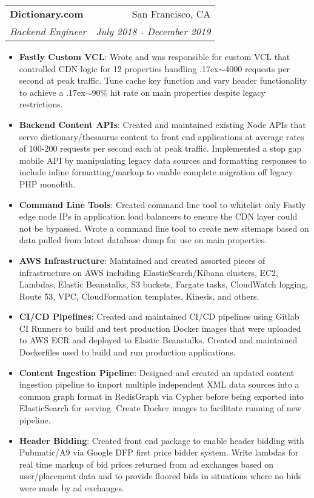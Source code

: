 \documentclass[letterpaper,11pt]{article}
\makeatletter
\newcommand{\resumeItem}[2]{
  \item\small{
    \textbf{#1}{: #2 \vspace{-2pt}}
  }
}
\newcommand{\resumeSubheading}[4]{
  \vspace{-1pt}\item
    \begin{tabular*}{0.97\textwidth}[t]{l@{\extracolsep{\fill}}r}
      \textbf{#1} & #2 \\
      \textit{\small#3} & \textit{\small #4} \\
    \end{tabular*}\vspace{-5pt}
}
\newcommand{\resumeItemListStart}{\begin{itemize}}
\newcommand{\resumeItemListEnd}{\end{itemize}\vspace{-5pt}}
\makeatother
\begin{document}
    \resumeSubheading
      {Dictionary.com}{San Francisco, CA}
      {Backend Engineer}{July 2018 - December 2019}
      \resumeItemListStart
        \resumeItem{Fastly Custom VCL}
          {Wrote and was responsible for custom VCL that controlled CDN logic for 12 properties handling {\raise.17ex\hbox{$\scriptstyle\sim$}}4000 requests per second at peak traffic. Tune cache key function and vary header functionality to achieve a {\raise.17ex\hbox{$\scriptstyle\sim$}}90\% hit rate on main properties despite legacy restrictions.}
        \resumeItem{Backend Content APIs}
          {Created and maintained existing Node APIs that serve dictionary/thesaurus content to front end applications at average rates of 100-200 requests per second each at peak traffic. Implemented a stop gap mobile API by manipulating legacy data sources and formatting responses to include inline formatting/markup to enable complete migration off legacy PHP monolith.}
        \resumeItem{Command Line Tools}
          {Created command line tool to whitelist only Fastly edge node IPs in application load balancers to ensure the CDN layer could not be bypassed. Wrote a command line tool to create new sitemaps based on data pulled from latest database dump for use on main properties.}
        \resumeItem{AWS Infrastructure}
          {Maintained and created assorted pieces of infrastructure on AWS including ElasticSearch/Kibana clusters, EC2, Lambdas, Elastic Beanstalks, S3 buckets, Fargate tasks, CloudWatch logging, Route 53, VPC, CloudFormation templates, Kinesis, and others. }
         \resumeItem{CI/CD Pipelines}
          {Created and maintained CI/CD pipelines using Gitlab CI Runners to build and test production Docker images that were uploaded to AWS ECR and deployed to Elastic Beanstalks. Created and maintained Dockerfiles used to build and run production applications.}
         \resumeItem{Content Ingestion Pipeline}
          {Designed and created an updated content ingestion pipeline to import multiple independent XML data sources into a common graph format in RedisGraph via Cypher before being exported into ElasticSearch for serving. Create Docker images to facilitate running of new pipeline.}
         \resumeItem{Header Bidding}
          {Created front end package to enable header bidding with Pubmatic/A9 via Google DFP first price bidder system. Write lambdas for real time markup of bid prices returned from ad exchanges based on user/placement data and to provide floored bids in situations where no bids were made by ad exchanges.   }
      \resumeItemListEnd
\end{document}
